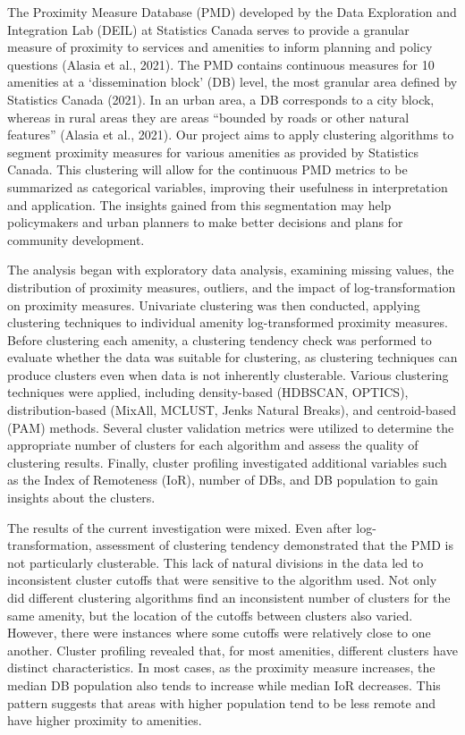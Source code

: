 \documentclass[11pt, a4paper]{article}
\begin{document}
The Proximity Measure Database (PMD) developed by the Data Exploration and Integration Lab (DEIL) at Statistics Canada serves to provide a granular measure of proximity to services and amenities to inform planning and policy questions (Alasia et al., 2021). The PMD contains continuous measures for 10 amenities at a `dissemination block' (DB) level, the most granular area defined by Statistics Canada (2021). In an urban area, a DB corresponds to a city block, whereas in rural areas they are areas “bounded by roads or other natural features” (Alasia et al., 2021). Our project aims to apply clustering algorithms to segment proximity measures for various amenities as provided by Statistics Canada. This clustering will allow for the continuous PMD metrics to be summarized as categorical variables, improving their usefulness in interpretation and application. The insights gained from this segmentation may help policymakers and urban planners to make better decisions and plans for community development.
\par
\hspace{1pc} The analysis began with exploratory data analysis, examining missing values, the distribution of proximity measures, outliers, and the impact of log-transformation on proximity measures. Univariate clustering was then conducted, applying clustering techniques to individual amenity log-transformed proximity measures. Before clustering each amenity, a clustering tendency check was performed to evaluate whether the data was suitable for clustering, as clustering techniques can produce clusters even when data is not inherently clusterable. Various clustering techniques were applied, including density-based (HDBSCAN, OPTICS), distribution-based (MixAll, MCLUST, Jenks Natural Breaks), and centroid-based (PAM) methods. Several cluster validation metrics were utilized to determine the appropriate number of clusters for each algorithm and assess the quality of clustering results. Finally, cluster profiling investigated additional variables such as the Index of Remoteness (IoR), number of DBs, and DB population to gain insights about the clusters.
\par
\hspace{1pc} The results of the current investigation were mixed. Even after log-transformation, assessment of clustering tendency demonstrated that the PMD is not particularly clusterable. This lack of natural divisions in the data led to inconsistent cluster cutoffs that were sensitive to the algorithm used. Not only did different clustering algorithms find an inconsistent number of clusters for the same amenity, but the location of the cutoffs between clusters also varied. However, there were instances where some cutoffs were relatively close to one another. Cluster profiling revealed that, for most amenities, different clusters have distinct characteristics. In most cases, as the proximity measure increases, the median DB population also tends to increase while median IoR decreases. This pattern suggests that areas with higher population tend to be less remote and have higher proximity to amenities. 
\end{document}

